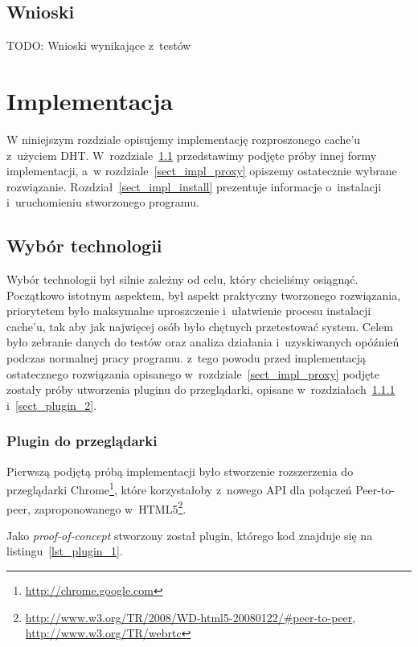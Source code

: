 \documentclass[a4paper,11pt]{scrartcl}
\newcommand{\s}{ }
\newcommand{\keszu}{cache'u}
\begin{document}
\subsection{Wnioski}
TODO: Wnioski wynikające z~testów

\section{Implementacja}
W niniejszym rozdziale opisujemy implementację rozproszonego \keszu\s z~użyciem DHT. W~rozdziale~\ref{sect_impl_technology}
przedstawimy podjęte próby innej formy implementacji, a~w rozdziale~\ref{sect_impl_proxy} opiszemy ostatecznie wybrane rozwiązanie.
Rozdział~\ref{sect_impl_install} prezentuje informacje o~instalacji i~uruchomieniu stworzonego programu.

\subsection{Wybór technologii}
\label{sect_impl_technology}
Wybór technologii był silnie zależny od celu, który chcieliśmy osiągnąć. Początkowo istotnym aspektem, był aspekt praktyczny tworzonego rozwiązania, priorytetem było maksymalne uproszczenie i~ułatwienie procesu instalacji \keszu, tak aby jak najwięcej osób było chętnych przetestować system. Celem było zebranie danych do testów oraz analiza działania i~uzyskiwanych opóźnień podczas normalnej pracy programu. z~tego powodu przed implementacją ostatecznego rozwiązania opisanego w~rozdziale~\ref{sect_impl_proxy} podjęte zostały próby utworzenia pluginu do przeglądarki, opisane w~rozdziałach~\ref{sect_plugin_1} i~\ref{sect_plugin_2}.

\subsubsection{Plugin do przeglądarki}
\label{sect_plugin_1}
Pierwszą podjętą próbą implementacji było stworzenie rozszerzenia do przeglądarki Chrome\footnote{\url{http://chrome.google.com}}, które korzystałoby z~nowego API dla połączeń Peer-to-peer, zaproponowanego w~HTML5\footnote{\url{http://www.w3.org/TR/2008/WD-html5-20080122/#peer-to-peer}, \url{http://www.w3.org/TR/webrtc}}.

Jako \textit{proof-of-concept} stworzony został plugin, którego kod znajduje się na listingu~\ref{lst_plugin_1}.
\end{document}
